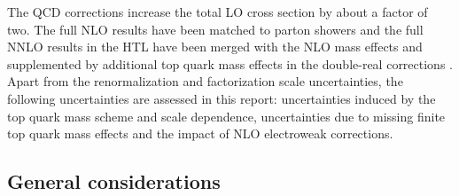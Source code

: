 The QCD corrections
increase the total LO cross section by about a factor of two. The full NLO results have been matched to parton showers \cite{Heinrich:2017kxx, Jones:2017giv,Bagnaschi:2023rbx} and the full NNLO results in the
HTL have been merged with the NLO mass effects and
supplemented by additional top quark mass effects in the double-real
corrections \cite{Grazzini:2018bsd}.
Apart from the renormalization and factorization scale uncertainties, the following uncertainties are assessed in this report: uncertainties induced by the top quark mass scheme and scale dependence, uncertainties due to missing finite top quark mass effects and the impact of NLO electroweak corrections.


\subsection{General considerations}

